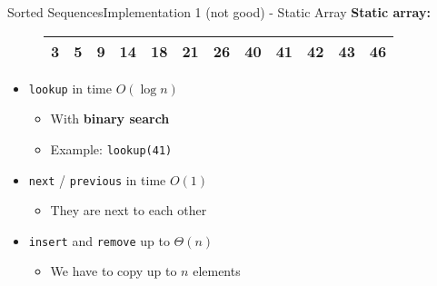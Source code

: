
\begin{frame}{Sorted Sequences}{Implementation 1 (not good) - Static Array}
  \textbf{Static array:}
    \begin{figure}[!b]
    \begin{tabular}{|c|c|c|c|c|c|c|c|c|c|c|c|}
      \hline
      3 & 5 & 9 & 14 & 18 & 21 & 26 & 40 & 41 & 42 & 43 & 46\\
      \hline
    \end{tabular}
    \label{fig:sorted_collections:impl_static_array}
  \end{figure}
  \begin{itemize}
    \item<2->
      {\color{MainA}\texttt{lookup}} in time \texttt{$O(\log n)$}
      \begin{itemize}
        \item<3-> With \textbf{binary search}
        \item<4-> Example: {\color{MainA}\texttt{lookup(41)}}
      \end{itemize}
    \item<5->
      {\color{MainA}\texttt{next}} /
      {\color{MainA}\texttt{previous}} in time $O(1)$
      \begin{itemize}
        \item<6-> They are next to each other
      \end{itemize}
    \item<7->
      {\color{MainA}\texttt{insert}} and
      {\color{MainA}\texttt{remove}} up to $\Theta(n)$\\
      \begin{itemize}
        \item<8-> We have to copy up to $n$ elements
      \end{itemize}
  \end{itemize}
\end{frame}


